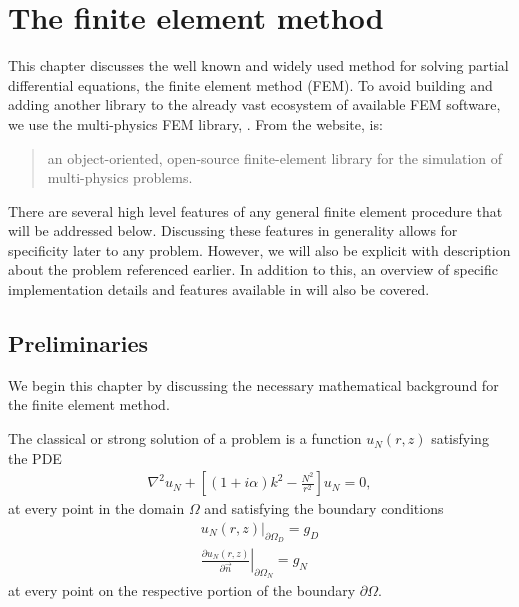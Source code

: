 \chapter{The finite element method}
\label{sec:fem}

This chapter discusses the well known and widely used method for solving partial differential equations, the finite element method (FEM).
To avoid building and adding another library to the already vast ecosystem of available FEM software, we use the multi-physics FEM library, \oomph.
From the website, \oomph is:
\begin{quote}
	an object-oriented, open-source finite-element library for the simulation of multi-physics problems. \cite{oomph}
\end{quote}
There are several high level features of any general finite element procedure that will be addressed below.
Discussing these features in generality allows for specificity later to any problem.
However, we will also be explicit with description about the problem referenced earlier.
In addition to this, an overview of specific implementation details and features available in \oomph will also be covered.






\section{Preliminaries}

\iffalse

.Problem
.Classical vs weak solution
Test functions
Sobolev space (where test functions live)
Basis/shape functions
Galerkin method -> test functions are basis functions

\fi

We begin this chapter by discussing the necessary mathematical background for the finite element method.

The classical or strong solution of a problem is a function $u_N(r,z)$ satisfying the PDE
\begin{align}
	\nabla^2 u_N + \left[ (1+i\alpha)k^2-\frac{N^2}{r^2}\right]u_N = 0,
\end{align}
at every point in the domain $\Omega$ and satisfying the boundary conditions
\begin{align}
	\left. u_N(r,z) \right\vert_{\partial \Omega_D} = g_D \\
	\left. \frac{\partial u_N(r,z)}{\partial \vec{n}} \right\vert_{\partial \Omega_N} = g_N
\end{align}
at every point on the respective portion of the boundary $\partial\Omega$.

